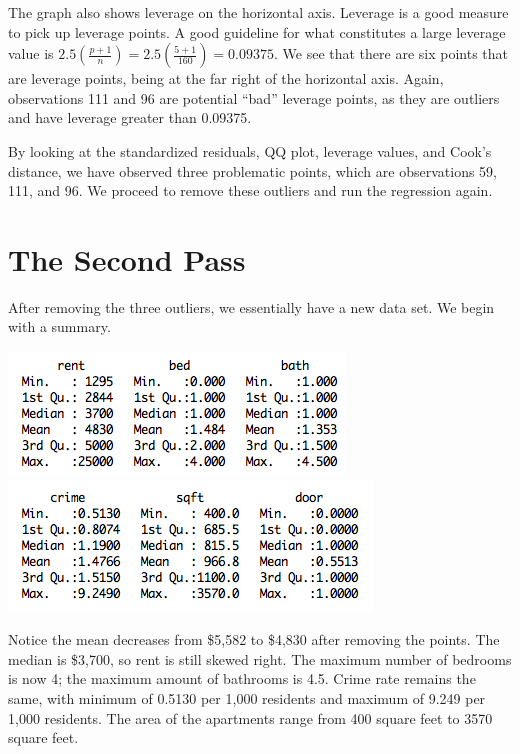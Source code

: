 \documentclass[a4 paper, 11 pt, twocolumn]{article}
\begin{document}
The graph also shows leverage on the horizontal axis. Leverage is a good measure to pick up leverage points. A good guideline for what constitutes a large leverage value is $2.5\left(\frac{p+1}{n}\right) = 2.5 \left(\frac{5+1}{160} \right) = 0.09375$. We see that there are six points that are leverage points, being at the far right of the horizontal axis. Again, observations 111 and 96 are potential ``bad'' leverage points, as they are outliers and have leverage greater than 0.09375.

By looking at the standardized residuals, QQ plot, leverage values, and Cook's distance, we have observed three problematic points, which are observations 59, 111, and 96. We proceed to remove these outliers and run the regression again.

\section{The Second Pass}
After removing the three outliers, we essentially have a new data set. We begin with a summary.
\begin{center}
\includegraphics[scale=0.7]{suma}
\includegraphics[scale=0.68]{sumb}
\end{center}
Notice the mean decreases from \$5,582 to \$4,830 after removing the points. The median is \$3,700, so rent is still skewed right. The maximum number of bedrooms is now 4; the maximum amount of bathrooms is 4.5. Crime rate remains the same, with minimum of 0.5130 per 1,000 residents and maximum of 9.249 per 1,000 residents. The area of the apartments range from 400 square feet to 3570 square feet.
\end{document}
